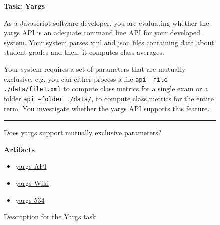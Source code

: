 \begin{figure}[!htb]
\begin{mdframed}[backgroundcolor=gray!05] 
\begin{scriptsize}

{\large \textbf{Task: Yargs}} \bigskip





As a Javascript software developer, you are evaluating whether the   yargs  API is an adequate command
line API for your developed system. Your system parses xml and json files containing data about student
grades and then, it computes class averages. \medskip

Your system requires a set of parameters that are mutually
exclusive, e.g. you can either process a file  \texttt{api --file ./data/file1.xml}   to compute class metrics for a
single exam or a folder \texttt{api --folder ./data/}, to compute class metrics for the entire term. You
investigate whether the yargs API supports this feature.


\begin{center}
\rule{10cm}{0.4pt}
\end{center}

Does yargs support mutually exclusive parameters?

\medskip

\textbf{Artifacts}

\begin{itemize}
    \item \href{https://github.com/yargs/yargs/blob/master/docs/api.md}{yargs API}
    \item \href{https://github.com/yargs/yargs/wiki}{yargs Wiki}
    \item \href{https://github.com/yargs/yargs/issues/534}{yargs-534}
\end{itemize}

\end{scriptsize}
\end{mdframed}
\caption{Description for the Yargs task}
\end{figure}

    
